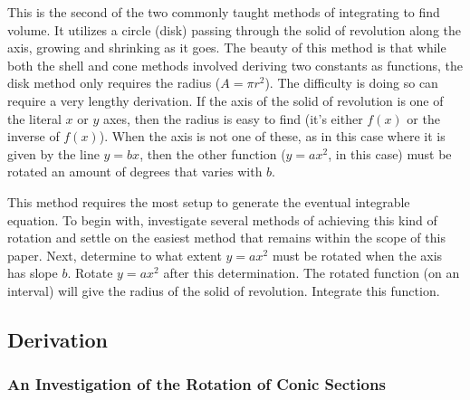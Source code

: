 \documentclass{article}
\begin{document}
This is the second of the two commonly taught methods of integrating to find volume. It utilizes a circle (disk) passing through the solid of revolution along the axis, growing and shrinking as it goes. The beauty of this method is that while both the shell and cone methods involved deriving two constants as functions, the disk method only requires the radius ($A=\pi r^2$). The difficulty is doing so can require a very lengthy derivation. If the axis of the solid of revolution is one of the literal $x$ or $y$ axes, then the radius is easy to find (it's either $f(x)$ or the inverse of $f(x)$). When the axis is not one of these, as in this case where it is given by the line $y=bx$, then the other function ($y=ax^2$, in this case) must be rotated an amount of degrees that varies with $b$.\par
This method requires the most setup to generate the eventual integrable equation. To begin with, investigate several methods of achieving this kind of rotation and settle on the easiest method that remains within the scope of this paper. Next, determine to what extent $y=ax^2$ must be rotated when the axis has slope $b$. Rotate $y=ax^2$ after this determination. The rotated function (on an interval) will give the radius of the solid of revolution. Integrate this function.

\subsection{Derivation} \label{deriv3}
\subsubsection{An Investigation of the Rotation of Conic Sections}
\end{document}
